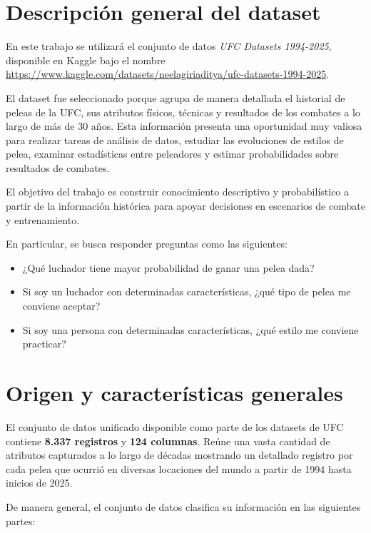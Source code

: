 \documentclass[11pt,a4paper]{article}
\begin{document}
\section{Descripción general del dataset}

En este trabajo se utilizará el conjunto de datos \textit{UFC Datasets 1994-2025}, disponible en Kaggle bajo el nombre \url{https://www.kaggle.com/datasets/neelagiriaditya/ufc-datasets-1994-2025}.

El dataset fue seleccionado porque agrupa de manera detallada el historial de peleas de la UFC, sus atributos físicos, técnicas y resultados de los combates a lo largo de más de 30 años. Esta información presenta una oportunidad muy valiosa para realizar tareas de análisis de datos, estudiar las evoluciones de estilos de pelea, examinar estadísticas entre peleadores y estimar probabilidades sobre resultados de combates.

El objetivo del trabajo es construir conocimiento descriptivo y probabilístico a partir de la información histórica para apoyar decisiones en escenarios de combate y entrenamiento.

En particular, se busca responder preguntas como las siguientes:

\begin{itemize}[leftmargin=*]
\item ¿Qué luchador tiene mayor probabilidad de ganar una pelea dada?
\item Si soy un luchador con determinadas características, ¿qué tipo de pelea me conviene aceptar?
\item Si soy una persona con determinadas características, ¿qué estilo me conviene practicar?
\end{itemize}

\section{Origen y características generales}

El conjunto de datos unificado  disponible como parte de los datasets de UFC contiene \textbf{8.337 registros} y \textbf{124 columnas}. Reúne una vasta cantidad de atributos capturados a lo largo de décadas mostrando un detallado registro por cada pelea que ocurrió en diversas locaciones del mundo a partir de 1994 hasta inicios de 2025. 

De manera general, el conjunto de datos clasifica su información en las siguientes partes:
\end{document}
